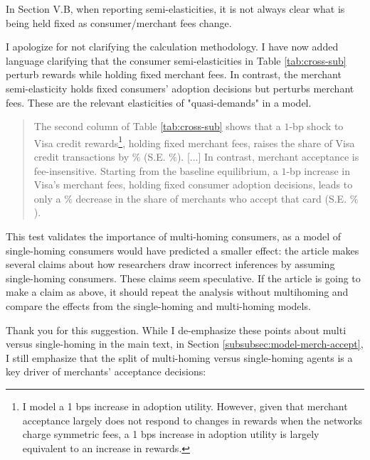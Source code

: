 \documentclass[main.tex]{subfiles}
\begin{document}
\begin{refsection}
\begin{refcommentnoclear}
In Section V.B, when reporting semi-elasticities, it is not always clear what is being held fixed as consumer/merchant fees change.
\end{refcommentnoclear}

I apologize for not clarifying the calculation methodology.
I have now added language clarifying that the consumer semi-elasticities in Table \ref{tab:cross-sub} perturb rewards while holding fixed merchant fees.
In contrast, the merchant semi-elasticity holds fixed consumers' adoption decisions but perturbs merchant fees.
These are the relevant elasticities of "quasi-demands" in a \textcite{Rochet.Tirole2003} model.

\begin{quotation}
    The second column of Table \ref{tab:cross-sub} shows that a $1$-bp shock to Visa credit rewards\footnote{I model a 1 bps increase in adoption utility. However, given that merchant acceptance largely does not respond to changes in rewards when the networks charge symmetric fees, a 1 bps increase in adoption utility is largely equivalent to an increase in rewards.}, holding fixed merchant fees, raises the share of Visa credit transactions by $\%$ (S.E.
$\%$).
    [...]
    In contrast, merchant acceptance is fee-insensitive.
Starting from the baseline equilibrium, a $1$-bp increase in Visa's merchant fees, holding fixed consumer adoption decisions, leads to only a $\%$ decrease in the share of merchants who accept that card (S.E.
$\%$).
\end{quotation}

\begin{refcommentnoclear}
This test validates the importance of multi-homing consumers, as a model of single-homing consumers would have predicted a smaller effect: the article makes several claims about how researchers draw incorrect inferences by assuming single-homing consumers.
These claims seem speculative.
If the article is going to make a claim as above, it should repeat the analysis without multihoming and compare the effects from the single-homing and multi-homing models.
\end{refcommentnoclear}

Thank you for this suggestion.
While I de-emphasize these points about multi versus single-homing in the main text, in Section \ref{subsubsec:model-merch-accept}, I still emphasize that the split of multi-homing versus single-homing agents is a key driver of merchants' acceptance decisions:


\end{refsection}
\end{document}
